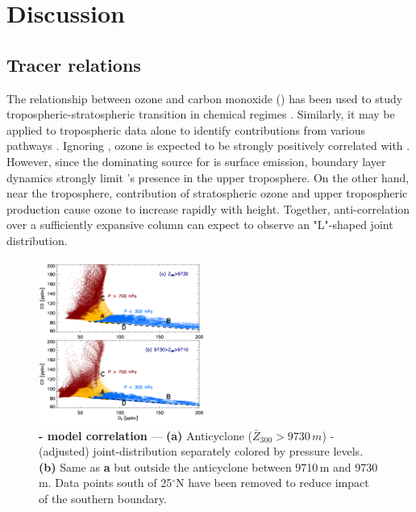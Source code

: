 \ifpdf
    \graphicspath{{Chapter_2006/figures/PNG/}{Chapter_2006/figures/PDF/}{Chapter_2006/figures/}}
\else
    \graphicspath{{Chapter_2006/figures/EPS/}{Chapter_2006/figures/}}
\fi

\section{Discussion}\label{sec:2006/discussion}

\subsection{Tracer relations}\label{ssec:2006/discuss/tracer}

The relationship between ozone and carbon monoxide () has been used to study tropospheric-stratospheric transition in
chemical regimes \citep[e.g.][and references therein]{Pan:2007sw,Hegglin:2009fk}. Similarly, it may be applied to tropospheric data
alone to identify contributions from various pathways \citep[e.g.][]{Zhang:2006zr,Voulgarakis:2011fk,Cristofanelli:2013uq}. Ignoring
, ozone is expected to be strongly positively correlated with  \citep{Chin:1994kx}. However, since the dominating
source for  is surface emission, boundary layer dynamics strongly limit 's presence in the upper troposphere.
On the other hand, near the troposphere, contribution of stratospheric ozone and upper tropospheric production cause ozone to
increase rapidly with height. Together,  anti-correlation over a sufficiently expansive column can expect to observe
an "L"-shaped joint distribution.

	\begin{figure}
		\centering
		\vspace{-.3in}
		\begin{singlespacing}
		\includegraphics[width=0.48\textwidth]{tracer/tracer_correlations}
		\caption[- model correlation]{{\label{fig:2006/o3co}\small\textbf{-
		model correlation} --- \textbf{(a)} Anticyclone ($\bar{Z}_{300}>9730\,\unit{m}$) -(adjusted)
		joint-distribution separately colored by pressure levels. \textbf{(b)} Same as \textbf{a} but outside the anticyclone
		between 9710\,\unit{m} and 9730\,\unit{m}. Data points south of 25$^\circ$N have been removed to reduce impact
		of the southern boundary. \vspace{-.3in}}}
		\end{singlespacing}
	\end{figure}

